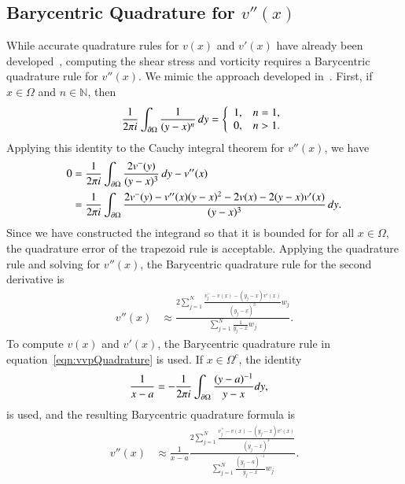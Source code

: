 \documentclass[preprint, 10pt]{elsarticle}
\begin{document}
\subsection{Barycentric Quadrature for $v''(x)$}
While accurate quadrature rules for $v(x)$ and $v'(x)$ have already been
developed~\cite{bar-wu-vee2015}, computing the shear stress and
vorticity requires a Barycentric quadrature rule for $v''(x)$.  We mimic
the approach developed in~\cite{bar-wu-vee2015}.  First, if $x \in
\Omega$ and $n \in \mathbb{N}$, then 
\begin{align}
  \frac{1}{2\pi i}\int_{{\partial}\Omega} \frac{1}{(y-x)^n}\, dy = 
  \left\{
    \begin{array}{ll}
      1, & n = 1, \\
      0, & n > 1. \\
    \end{array}
  \right.
\end{align}
Applying this identity to the Cauchy integral theorem for $v''(x)$, we
have
\begin{align}
  0 &= \frac{1}{2\pi i} \int_{{\partial}\Omega} 
      \frac{2v^{-}(y)}{(y-x)^3}\,dy - v''(x) \\
    &= \frac{1}{2\pi i} \int_{{\partial}\Omega} 
      \frac{2v^{-}(y) - v''(x)(y-x)^2 - 2v(x) - 2(y-x)v'(x)}
      {(y-x)^3}\, dy.
\end{align}
Since we have constructed the integrand so that it is bounded for for
all $x \in \Omega$, the quadrature error of the trapezoid rule is
acceptable.  Applying the quadrature rule and solving for $v''(x)$, the
Barycentric quadrature rule for the second derivative is
\begin{align}
  v''(x) &\approx \frac{2\sum\limits_{j=1}^N 
    \frac{v^{-}_{j} - v(x) - (y_j-x)v'(x)}{(y_j-x)^3}w_j}
    {\sum\limits_{j=1}^N \frac{1}{y_j-x}w_j}.
\end{align}
To compute $v(x)$ and $v'(x)$, the Barycentric quadrature rule in
equation~\eqref{eqn:vvpQuadrature} is used. If $x \in \Omega^c$, the
identity
\begin{align}
\frac{1}{x-a} &= -\frac{1}{2\pi i}\int_{{\partial}\Omega} 
    \frac{(y-a)^{-1}}{y-x} dy, 
\end{align}
is used, and the resulting Barycentric quadrature formula is
\begin{align}
  v''(x) &\approx \frac{1}{x-a}\frac{2\sum\limits_{j=1}^N
    \frac{v^{+}_{j} - v(x) - (y_j-x)v'(x)}{(y_j-x)^3}}
    {\sum\limits_{j=1}^N \frac{(y_j-a)^{-1}}{y_j-x}w_j}.
\end{align}
\end{document}
